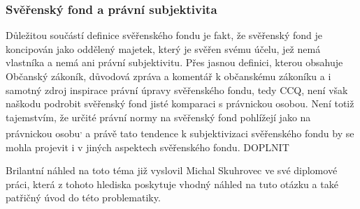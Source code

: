 \documentclass{article}
\begin{document}
\subsubsection{Svěřenský fond a právní subjektivita}


Důležitou součástí definice svěřenského fondu je fakt, že svěřenský fond je koncipován jako oddělený majetek, který je svěřen svému účelu, jež nemá vlastníka a nemá ani právní subjektivitu. Přes jasnou definici, kterou obsahuje Občanský zákoník, důvodová zpráva a komentář k občanskému zákoníku a i samotný zdroj inspirace právní úpravy svěřenského fondu, tedy CCQ, není však naškodu podrobit svěřenský fond jisté komparaci s právnickou osobou. Není totiž tajemstvím, že určité právní normy na svěřenský fond pohlížejí jako na právnickou osobu\textsuperscript{,} a právě tato tendence k subjektivizaci svěřenského fondu by se mohla projevit i v jiných aspektech svěřenského fondu. DOPLNIT

Brilantní náhled na toto téma již vyslovil Michal Skuhrovec ve své diplomové práci, která z tohoto hlediska poskytuje vhodný náhled na tuto otázku a také patřičný úvod do této problematiky.



\end{document}
